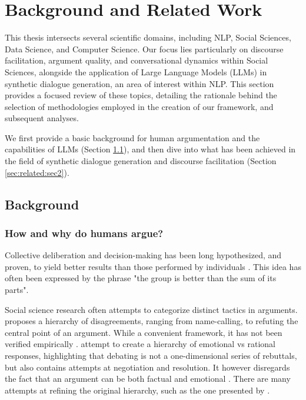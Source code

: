 %
\chapter{Background and Related Work}
\label{sec:related}

This thesis intersects several scientific domains, including \ac{NLP}, Social Sciences, Data Science, and Computer Science. Our focus lies particularly on discourse facilitation, argument quality, and conversational dynamics within Social Sciences, alongside the application of Large Language Models (LLMs) in synthetic dialogue generation, an area of interest within \ac{NLP}. This section provides a focused review of these topics, detailing the rationale behind the selection of methodologies employed in the creation of our framework, and subsequent analyses. 

We first provide a basic background for human argumentation and the capabilities of LLMs (Section \ref{sec:related:sec1}), and then dive into what has been achieved in the field of synthetic dialogue generation and discourse facilitation (Section \ref{sec:related:sec2}).


\section{Background}
\label{sec:related:sec1}

\subsection{How and why do humans argue?}
\label{sec:background:arguments-how}

Collective deliberation and decision-making has been long hypothesized, and proven, to yield better results than those performed by individuals \cite{david-collaborative, stefan-dissent}. This idea has often been expressed by the phrase "the group is better than the sum of its parts". 

Social science research often attempts to categorize distinct tactics in arguments. \citet{graham2008disagree} proposes a hierarchy of disagreements, ranging from name-calling, to refuting the central point of an argument.  While a convenient framework, it has not been verified empirically \cite{dekock2022disagree}. \citet{walker-etal-2012-corpus} attempt to create a hierarchy of emotional vs rational responses, highlighting that debating is not a one-dimensional series of rebuttals, but also contains attempts at negotiation and resolution. It however disregards the fact that an argument can be both factual and emotional \cite{dekock2022disagree}. There are many attempts at refining the original hierarchy, such as the one presented by \citet{benesch2016counterspeech}.

